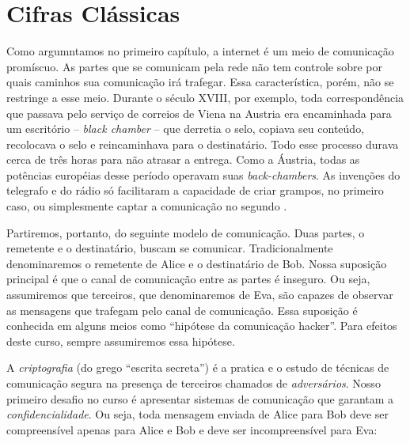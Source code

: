 \chapter{Cifras Clássicas}
\label{cha:cifras-classicas}

Como argumntamos no primeiro capítulo, a internet é um meio de comunicação promíscuo.
As partes que se comunicam pela rede não tem controle sobre por quais caminhos sua comunicação irá trafegar.
Essa característica, porém, não se restringe a esse meio.
Durante o século XVIII, por exemplo, toda correspondência que passava pelo serviço de correios de Viena na Austria era encaminhada para um escritório -- {\em black chamber} -- que derretia o selo, copiava seu conteúdo, recolocava o selo e reincaminhava para o destinatário.
Todo esse processo durava cerca de três horas para não atrasar a entrega.
Como a Áustria, todas as potências européias desse período operavam suas {\em back-chambers}.
As invenções do telegrafo e do rádio só facilitaram a capacidade de criar grampos, no primeiro caso, ou simplesmente captar a comunicação no segundo \cite{Kahn96}.

Partiremos, portanto, do seguinte modelo de comunicação.
Duas partes, o remetente e o destinatário, buscam se comunicar.
Tradicionalmente denominaremos o remetente de Alice e o destinatário de Bob.
Nossa suposição principal é que o canal de comunicação entre as partes é inseguro.
Ou seja, assumiremos que terceiros, que denominaremos de Eva, são capazes de observar as mensagens que trafegam pelo canal de comunicação.
Essa suposição é conhecida em alguns meios como ``hipótese da comunicação hacker''.
Para efeitos deste curso, sempre assumiremos essa hipótese.

A {\em criptografia} (do grego ``escrita secreta'') é a pratica e o estudo de técnicas de comunicação segura na presença de terceiros chamados de {\em adversários}.
Nosso primeiro desafio no curso é apresentar sistemas de comunicação que garantam a {\em confidencialidade}.
Ou seja, toda mensagem enviada de Alice para Bob deve ser compreensível apenas para Alice e Bob e deve ser incompreensível para Eva:
\begin{center}
\end{center}

